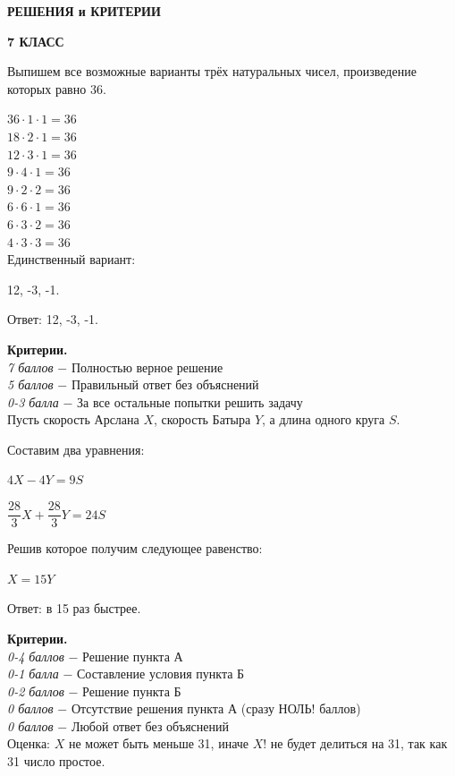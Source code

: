 \centerline{\bf \Large  РЕШЕНИЯ и КРИТЕРИИ}

\centerline{\bf \Large  7 КЛАСС}

 Выпишем все возможные варианты трёх натуральных чисел, произведение которых равно 36.

$36\cdot1\cdot1=36$\\
$18\cdot2\cdot1=36$\\
$12\cdot3\cdot1=36$\\
$9\cdot4\cdot1=36$\\
$9\cdot2\cdot2=36$\\
$6\cdot6\cdot1=36$\\
$6\cdot3\cdot2=36$\\
$4\cdot3\cdot3=36$\\

Единственный вариант:

12, -3, -1.

Ответ: 12, -3, -1.
\par

\textbf{Критерии.} \\
\textit{7 баллов} $-$ Полностью верное решение\\
\textit{5 баллов} $-$ Правильный ответ без объяснений\\
\textit{0-3 балла} $-$  За все остальные попытки решить задачу\\

 Пусть скорость Арслана $X$, скорость Батыра $Y$, а длина одного круга $S$.

Составим два уравнения:

$4X-4Y=9S$

$\dfrac{28}{3}X+\dfrac{28}{3}Y=24S$

Решив которое получим следующее равенство:

$X=15Y$

Ответ: в 15 раз быстрее.
\par
\textbf{Критерии.} \\
\textit{0-4 баллов} $-$ Решение пункта А\\
\textit{0-1 балла} $-$ Составление условия пункта Б \\
\textit{0-2 баллов} $-$ Решение пункта Б\\
\textit{0 баллов} $-$ Отсутствие решения пункта А (сразу НОЛЬ! баллов)\\
\textit{0 баллов} $-$ Любой ответ без объяснений\\


 Оценка: $X$ не может быть меньше 31, иначе $X!$ не будет делиться на 31, так как 31 число простое.

